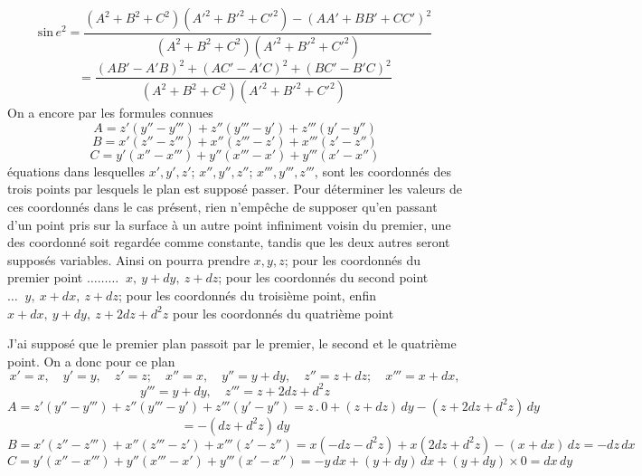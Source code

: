 \documentclass[11pt,a4paper]{article}
\begin{document}
\[ \text{sin}\,e^2 = \frac{(A^2 + B^2 + C^2)(A'^2 + B'^2 + C'^2) - (AA' + BB' + CC')^2}{(A^2 + B^2 + C^2)(A'^2 + B'^2 + C'^2)} \]
\[ = \frac{(AB' - A'B)^2 + (AC' - A'C)^2 + (BC' - B'C)^2}{(A^2 + B^2 + C^2)(A'^2 + B'^2 + C'^2)} \]
On a encore par les formules connues
\[ A = z'(y'' - y''') + z''(y''' - y') + z'''(y' - y'') \]
\[ B = x'(z'' - z''') + x''(z''' - z') + x'''(z' - z'') \]
\[ C = y'(x'' - x''') + y''(x''' - x') + y'''(x' - x'') \]
équations dans lesquelles $x', y', z'$; $x'', y'', z''$; $x''', y''', z'''$, sont les coordonnés
des trois points par lesquels le plan est supposé passer. Pour déterminer
les valeurs de ces coordonnés dans le cas présent, rien n'empêche de
supposer qu'en passant d'un point pris sur la surface à un
autre point infiniment voisin du premier, une des coordonné soit
regardée comme constante, tandis que les deux autres seront supposés
variables. Ainsi on pourra prendre $x, y, z$; pour les coordonnés du
premier point $\ldots\ldots\ldots\;\; x,\ y + dy,\ z + dz$; pour les
coordonnés du second point $\ldots\;\; y,\ x + dx,\ z + dz$; pour les
coordonnés du troisième point, enfin $x + dx,\ y + dy,\ z + 2dz + d^2z$
pour les coordonnés du quatrième point

J'ai supposé que le premier plan passoit par le premier, le second
et le quatrième point. On a donc pour ce plan
\[ x' = x,\quad y' = y,\quad z' = z;\quad x'' = x,\quad y'' = y + dy,\quad z'' = z + dz;\quad x''' = x + dx, \]
\[ y''' = y + dy,\quad z''' = z + 2dz + d^2z \]
\[ A = z'(y'' - y''') + z''(y''' - y') + z'''(y' - y'') = z\,.\,0 + (z + dz)\,dy - (z + 2dz + d^2z)\,dy \]
\[ = -(dz + d^2z)\,dy \]
\[ B = x'(z'' - z''') + x''(z''' - z') + x'''(z' - z'') = x(-dz - d^2z) + x(2dz + d^2z) - (x + dx)\,dz = -dz\,dx \]
\[ C = y'(x'' - x''') + y''(x''' - x') + y'''(x' - x'') = -y\,dx + (y + dy)\,dx + (y + dy) \times 0 = dx\,dy \]
\end{document}
